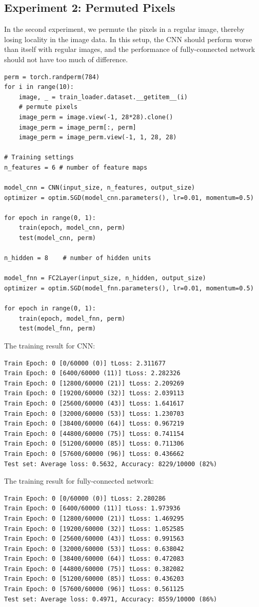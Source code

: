         \subsection{Experiment 2: Permuted Pixels}
        In the second experiment, we permute the pixels in a regular image, thereby losing locality in the image data.
        In this setup, the CNN should perform worse than itself with regular images, and the performance of fully-connected network should not have too much of difference.
        
        \begin{verbatim}
perm = torch.randperm(784)
for i in range(10):
    image, _ = train_loader.dataset.__getitem__(i)
    # permute pixels
    image_perm = image.view(-1, 28*28).clone()
    image_perm = image_perm[:, perm]
    image_perm = image_perm.view(-1, 1, 28, 28)

# Training settings 
n_features = 6 # number of feature maps

model_cnn = CNN(input_size, n_features, output_size)
optimizer = optim.SGD(model_cnn.parameters(), lr=0.01, momentum=0.5)

for epoch in range(0, 1):
    train(epoch, model_cnn, perm)
    test(model_cnn, perm)

n_hidden = 8    # number of hidden units

model_fnn = FC2Layer(input_size, n_hidden, output_size)
optimizer = optim.SGD(model_fnn.parameters(), lr=0.01, momentum=0.5)

for epoch in range(0, 1):
    train(epoch, model_fnn, perm)
    test(model_fnn, perm)
        \end{verbatim}
        The training result for CNN:
        \begin{verbatim}
Train Epoch: 0 [0/60000 (0)] tLoss: 2.311677
Train Epoch: 0 [6400/60000 (11)] tLoss: 2.282326
Train Epoch: 0 [12800/60000 (21)] tLoss: 2.209269
Train Epoch: 0 [19200/60000 (32)] tLoss: 2.039113
Train Epoch: 0 [25600/60000 (43)] tLoss: 1.641617
Train Epoch: 0 [32000/60000 (53)] tLoss: 1.230703
Train Epoch: 0 [38400/60000 (64)] tLoss: 0.967219
Train Epoch: 0 [44800/60000 (75)] tLoss: 0.741154
Train Epoch: 0 [51200/60000 (85)] tLoss: 0.711306
Train Epoch: 0 [57600/60000 (96)] tLoss: 0.436662
Test set: Average loss: 0.5632, Accuracy: 8229/10000 (82%)
        \end{verbatim}
        The training result for fully-connected network:
        \begin{verbatim}
Train Epoch: 0 [0/60000 (0)] tLoss: 2.280286
Train Epoch: 0 [6400/60000 (11)] tLoss: 1.973936
Train Epoch: 0 [12800/60000 (21)] tLoss: 1.469295
Train Epoch: 0 [19200/60000 (32)] tLoss: 1.052585
Train Epoch: 0 [25600/60000 (43)] tLoss: 0.991563
Train Epoch: 0 [32000/60000 (53)] tLoss: 0.638042
Train Epoch: 0 [38400/60000 (64)] tLoss: 0.472083
Train Epoch: 0 [44800/60000 (75)] tLoss: 0.382082
Train Epoch: 0 [51200/60000 (85)] tLoss: 0.436203
Train Epoch: 0 [57600/60000 (96)] tLoss: 0.561125
Test set: Average loss: 0.4971, Accuracy: 8559/10000 (86%)
        \end{verbatim}
